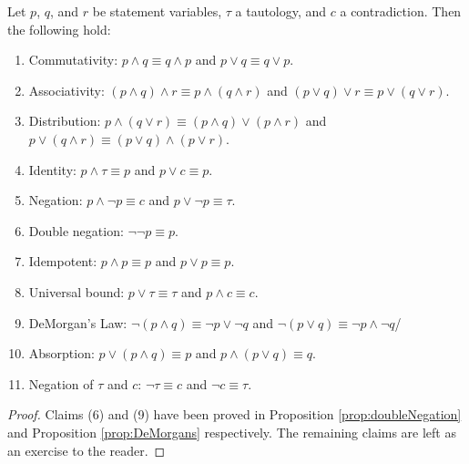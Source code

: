 \guard











\begin{thm}
\label{thm:logicalEquivalences}
  Let $p$, $q$, and $r$ be statement variables, $\tau$ a tautology, and $c$ a contradiction.
  Then the following hold:
  \begin{enumerate}
    \item Commutativity: $p\wedge q\equiv q\wedge p$ and $p\vee q\equiv q\vee p$.
    \item Associativity: $(p\wedge q)\wedge r \equiv p\wedge(q\wedge r)$ and $(p\vee q)\vee r \equiv p\vee(q\vee r)$.
    \item Distribution: $p\wedge(q\vee r)\equiv (p\wedge q)\vee(p\wedge r)$ and $p\vee(q\wedge r)\equiv (p\vee q)\wedge(p\vee r)$.
    \item Identity: $p\wedge \tau\equiv p$ and $p\vee c \equiv p$.
    \item Negation: $p\wedge\neg p \equiv c$ and $p\vee\neg p \equiv \tau$.
    \item Double negation: $\neg\neg p \equiv p$.
    \item Idempotent: $p\wedge p\equiv p$ and $p\vee p \equiv p$.
    \item Universal bound: $p\vee\tau\equiv\tau$ and $p\wedge c\equiv c $.
    \item DeMorgan's Law: $\neg(p\wedge q) \equiv \neg p \vee \neg q$ and $\neg(p\vee q) \equiv \neg p \wedge \neg q$/
    \item Absorption: $p\vee(p\wedge q)\equiv p$ and $p\wedge(p\vee q)\equiv q$.
    \item Negation of $\tau$ and $c$: $\neg\tau\equiv c$ and $\neg c \equiv \tau$.
  \end{enumerate}
\end{thm}
\begin{proof}
  Claims (6) and (9) have been proved in Proposition \ref{prop:doubleNegation} and Proposition \ref{prop:DeMorgans} respectively.
  The remaining claims are left as an exercise to the reader.
\end{proof}


